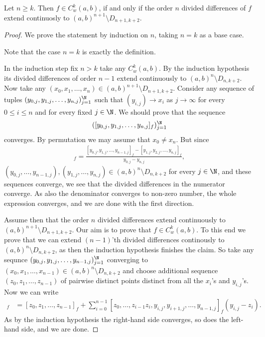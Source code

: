 \begin{lem}\label{weaklyCk_basic}
	Let $n \geq k$. Then $f \in C_{w}^{k}(a, b)$, if and only if the order $n$ divided differences of $f$ extend continuosly to $(a, b)^{n + 1} \setminus D_{n + 1, k + 2}$.
\end{lem}
\begin{proof}
	We prove the statement by induction on $n$, taking $n = k$ as a base case.

	Note that the case $n = k$ is exactly the definition.

	In the induction step fix $n > k$ take any $C_{w}^{k}(a, b)$. By the induction hypothesis its divided differences of order $n - 1$ extend continuously to $(a, b)^{n} \setminus D_{n, k + 2}$. Now take any $(x_{0}, x_{1}, \ldots, x_{n}) \in (a, b)^{n + 1} \setminus D_{n + 1, k + 2}$. Consider any sequence of tuples $(y_{0, j}, y_{1, j}, \ldots, y_{n, j})_{j = 1}^{\N}$ such that $(y_{i, j}) \to x_{i}$ as $j \to \infty$ for every $0 \leq i \leq n$ and for every fixed $j \in \N$. We should prove that the sequence
	\begin{align*}
		([y_{0, j}, y_{1, j}, \ldots, y_{n, j}]_{f})_{j = 1}^{\N}
	\end{align*}
	converges. By permutation we may assume that $x_{0} \neq x_{n}$. But since
	\begin{align*}
		[y_{0, j}, y_{1, j}, \ldots, y_{n, j}]_{f} = \frac{[y_{0, j}, y_{1, j}, \ldots, y_{n - 1, j}]_{f} - [y_{1, j}, y_{2, j}, \ldots, y_{n, j}]_{f}}{y_{0, j} - y_{n, j}},
	\end{align*}
	$(y_{0, j}, \ldots, y_{n - 1, j}), (y_{1, j}, \ldots, y_{n, j}) \in (a, b)^{n} \setminus D_{n, k + 2}$ for every $j \in \N$, and these sequences converge, we see that the divided differences in the numerator converge. As also the denominator converges to non-zero number, the whole expression converges, and we are done with the first direction.

	Assume then that the order $n$ divided differences extend continuously to $(a, b)^{n + 1} \setminus D_{n + 1, k + 2}$. Our aim is to prove that $f \in C_{w}^{k}(a, b)$. To this end we prove that we can extend $(n - 1)$'th divided differences continously to $(a, b)^{n} \setminus D_{n, k + 2}$, as then the induction hypothesis finishes the claim. So take any sequnce $(y_{0, j}, y_{1, j}, \ldots, y_{n - 1, j})_{j = 1}^{\N}$ converging to $(x_{0}, x_{1}, \ldots, x_{n - 1}) \in (a, b)^{n} \setminus D_{n, k + 2}$ and choose additional sequence $(z_{0}, z_{1}, \ldots, z_{n - 1})$ of pairwise distinct points distinct from all the $x_{i}$'s and $y_{i, j}$'s. Now we can write
	\begin{align*}
		[y_{0, j}, \ldots, y_{n - 1, j}]_{f} &= [z_{0}, z_{1}, \ldots, z_{n - 1}]_{f} + \sum_{i = 0}^{n - 1}[z_{0}, \ldots, z_{i - 1} z_{i}, y_{i, j}, y_{i + 1, j}, \ldots, y_{n - 1, j}]_{f} (y_{i, j} - z_{i}).
	\end{align*}
	As by the induction hypothesis the right-hand side converges, so does the left-hand side, and we are done.
\end{proof}

